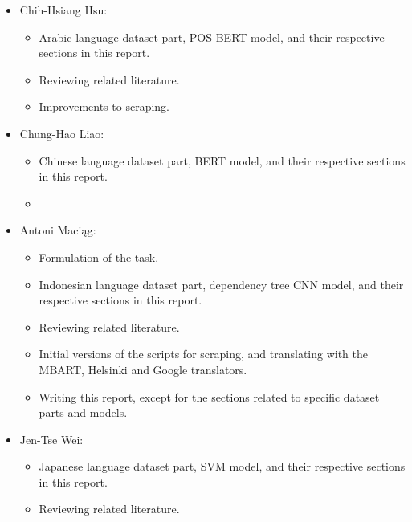 \documentclass[twocolumn]{article}
\begin{document}
\begin{itemize}

	\item Chih-Hsiang Hsu:
	\begin{itemize}
		\item Arabic language dataset part, POS-BERT model, and their respective sections in this report.
		\item Reviewing related literature.
		\item Improvements to scraping.
	\end{itemize}
	
	\item Chung-Hao Liao:
	\begin{itemize}
		\item Chinese language dataset part, BERT model, and their respective sections in this report.
		\item 
	\end{itemize}
	
	\item Antoni Maciąg:
	\begin{itemize}
		\item Formulation of the task.
		\item Indonesian language dataset part, dependency tree CNN model, and their respective sections in this report.
		\item Reviewing related literature.
		\item Initial versions of the scripts for scraping, and translating with the MBART, Helsinki and Google translators.
		\item Writing this report, except for the sections related to specific dataset parts and models.
	\end{itemize}
	
	\item Jen-Tse Wei:
	\begin{itemize}
		\item Japanese language dataset part, SVM model, and their respective sections in this report.
		\item Reviewing related literature.
	\end{itemize}
	

	
\end{itemize}

\newpage
\end{document}
